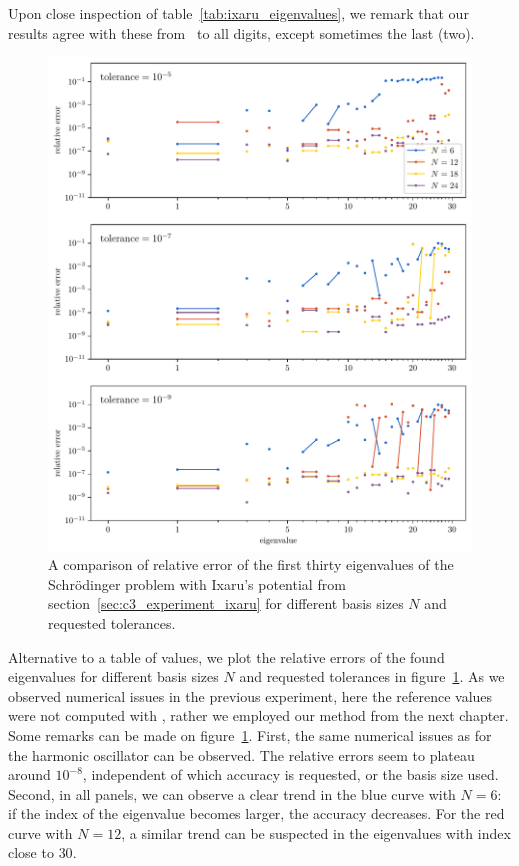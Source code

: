 Upon close inspection of table~\ref{tab:ixaru_eigenvalues}, we remark that our results agree with these from~\cite{ixaru_new_2010} to all digits, except sometimes the last (two).

\begin{figure}
  \begin{center}
    \includegraphics[width=\textwidth]{img/chapter3/experiments/ixaru.pdf}
  \end{center}
  \caption{A comparison of relative error of the first thirty eigenvalues of the Schrödinger problem with Ixaru's potential from section~\ref{sec:c3_experiment_ixaru} for different basis sizes $N$ and requested tolerances.}\label{fig:c3_experiment_ixaru}
\end{figure}

Alternative to a table of values, we plot the relative errors of the found eigenvalues for different basis sizes $N$ and requested tolerances in figure~\ref{fig:c3_experiment_ixaru}. As we observed numerical issues in the previous experiment, here the reference values were not computed with \pyslisetd{}, rather we employed our method from the next chapter. Some remarks can be made on figure~\ref{fig:c3_experiment_ixaru}. First, the same numerical issues as for the harmonic oscillator can be observed. The relative errors seem to plateau around $10^{-8}$, independent of which accuracy is requested, or the basis size used. Second, in all panels, we can observe a clear trend in the blue curve with $N = 6$: if the index of the eigenvalue becomes larger, the accuracy decreases. For the red curve with $N = 12$,  a similar trend can be suspected in the eigenvalues with index close to $30$.

